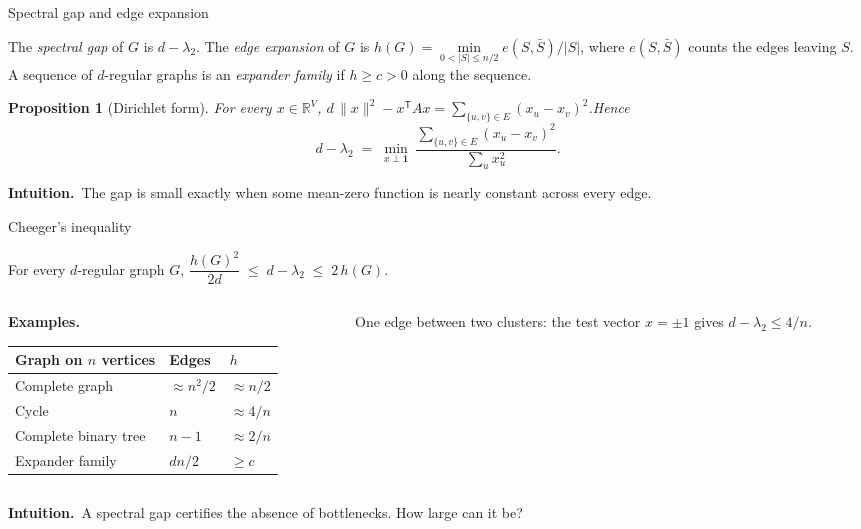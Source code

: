 \documentclass[aspectratio=169,10pt]{beamer}
\newtheorem{proposition}[theorem]{Proposition}
\newcommand{\one}{\mathbf{1}}
\newcommand{\intuition}{{\color{accent}\textbf{Intuition.}}\ }
\begin{document}
\begin{frame}{Spectral gap and edge expansion}
  \begin{definition}
    The \emph{spectral gap} of $G$ is $d-\lambda_2$. The \emph{edge expansion} of $G$ is
    $h(G)=\min\limits_{0<|S|\le n/2} e(S,\bar S)/|S|$, where $e(S,\bar S)$ counts the edges leaving $S$.
    A sequence of $d$-regular graphs is an \emph{expander family} if $h\ge c>0$ along the sequence.
  \end{definition}
  \begin{proposition}[Dirichlet form]
    For every $x\in\mathbb{R}^{V}$,\quad
    $d\,\lVert x\rVert^2-x^{\mathsf T}Ax=\sum_{\{u,v\}\in E}(x_u-x_v)^2$.\quad Hence
    \[
      d-\lambda_2\;=\;\min_{x\perp\one}\ \frac{\sum_{\{u,v\}\in E}(x_u-x_v)^2}{\sum_u x_u^2}.
    \]
    \vspace{-5mm}
  \end{proposition}
  \intuition The gap is small exactly when some mean-zero function is nearly constant across every edge.
\end{frame}

\begin{frame}{Cheeger's inequality}
  \begin{theorem}
    For every $d$-regular graph $G$,\qquad
    $\dfrac{h(G)^2}{2d}\;\le\;d-\lambda_2\;\le\;2\,h(G)$.
  \end{theorem}
  \begin{columns}[T,onlytextwidth]
    \begin{column}{0.50\textwidth}
      \textbf{Examples.}\\[1mm]
      {\small
      \begin{tabular}{@{}lll@{}}
        \toprule
        Graph on $n$ vertices & Edges & $h$\\
        \midrule
        Complete graph & $\approx n^2/2$ & $\approx n/2$\\
        Cycle & $n$ & $\approx 4/n$\\
        Complete binary tree & $n-1$ & $\approx 2/n$\\
        Expander family & $dn/2$ & $\ge c$\\
        \bottomrule
      \end{tabular}}
    \end{column}
    \begin{column}{0.40\textwidth}
      \centering
      

      \raggedright\small
      One edge between two clusters: the test vector $x=\pm1$ gives $d-\lambda_2\le4/n$.
    \end{column}
  \end{columns}
  \vspace{2mm}
  \intuition A spectral gap certifies the absence of bottlenecks. How large can it be?
\end{frame}
\end{document}
